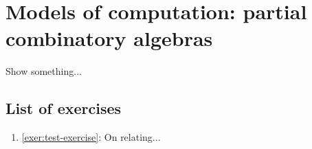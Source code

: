 \chapter{Models of computation: partial combinatory algebras}\label{chap:PCA}

\begin{exercise}\label{exer:test-exercise}
  Show something...
\end{exercise}

\section{List of exercises}
\begin{enumerate}
\item \cref{exer:test-exercise}: On relating...
\end{enumerate}




